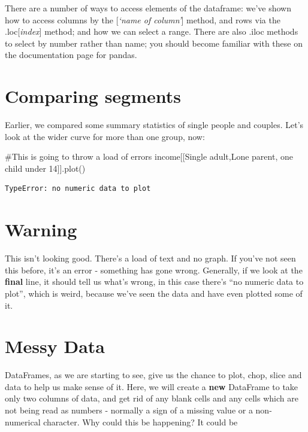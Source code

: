 \documentclass[
  letterpaper,
  DIV=11,
  numbers=noendperiod]{scrreprt}
\newenvironment{Shaded}{\begin{snugshade}}{\end{snugshade}}
\newcommand{\CommentTok}[1]{\textcolor[rgb]{0.37,0.37,0.37}{#1}}
\newcommand{\NormalTok}[1]{\textcolor[rgb]{0.00,0.23,0.31}{#1}}
\newcommand{\StringTok}[1]{\textcolor[rgb]{0.13,0.47,0.30}{#1}}
\begin{document}
There are a number of ways to access elements of the dataframe: we've
shown how to access columns by the {[}\emph{`name of column'}{]} method,
and rows via the .loc{[}\emph{index}{]} method; and how we can select a
range. There are also .iloc methods to select by number rather than
name; you should become familiar with these on the documentation page
for pandas.

\hypertarget{comparing-segments}{%
\section{Comparing segments}\label{comparing-segments}}

Earlier, we compared some summary statistics of single people and
couples. Let's look at the wider curve for more than one group, now:

\begin{Shaded}
\begin{Highlighting}[]
\CommentTok{\#This is going to throw a load of errors}
\NormalTok{income[[}\StringTok{\textquotesingle{}Single adult\textquotesingle{}}\NormalTok{,}\StringTok{\textquotesingle{}Lone parent, one child under 14\textquotesingle{}}\NormalTok{]].plot()}
\end{Highlighting}
\end{Shaded}

\begin{verbatim}
TypeError: no numeric data to plot
\end{verbatim}

\hypertarget{warning}{%
\section{Warning}\label{warning}}

This isn't looking good. There's a load of text and no graph. If you've
not seen this before, it's an error - something has gone wrong.
Generally, if we look at the \textbf{final} line, it should tell us
what's wrong, in this case there's ``no numeric data to plot'', which is
weird, because we've seen the data and have even plotted some of it.

\hypertarget{messy-data}{%
\section{Messy Data}\label{messy-data}}

DataFrames, as we are starting to see, give us the chance to plot, chop,
slice and data to help us make sense of it. Here, we will create a
\textbf{new} DataFrame to take only two columns of data, and get rid of
any blank cells and any cells which are not being read as numbers -
normally a sign of a missing value or a non-numerical character. Why
could this be happening? It could be
\end{document}
